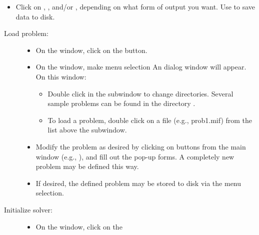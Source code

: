 \begin{list}{}{\setlength{\labelwidth}{0pt}
               \setlength{\leftmargin}{0pt}
               \setlength{\rightmargin}{\leftmargin}
               \setlength{\itemsep}{0pt}}
\begin{itemize}
\begin{itemize}
                   to grab/modify a problem for 
                   or 
       \item {\bf{mmSolve2D:}}
                   to control the 2D solver
       \item {\bf{Oxsii:}}
                   to control the 3D solver
    \end{itemize}
    \item Click on , , and/or
          , depending on what form of output you
          want.  Use  to save data to disk.
  \end{itemize}
  \item {}
    \begin{description}
    \item[Load problem:]\blankspace
    \begin{itemize}
      \item On the  window, click on the 
         button.
      \item On the  window, make menu selection
              An  dialog window
            will appear.  On this window:
      \begin{itemize}
        \item Double click in the  subwindow to change
              directories.  Several sample problems can be found in
              the directory .
        \item To load a problem, double click on a  file
              (e.g., prob1.mif) from the list above the 
              subwindow.
      \end{itemize}
      \item Modify the problem as desired by clicking on buttons from
            the main  window (e.g., ), and fill out the pop-up forms.  A
            completely new problem may be defined this way.
      \item If desired, the defined problem may be stored to disk via
            the  menu selection.
    \end{itemize}
    \item[Initialize solver:]\blankspace
    \begin{itemize}
      \item On the  window, click on the 

\end{itemize}
\end{description}
\end{list}
